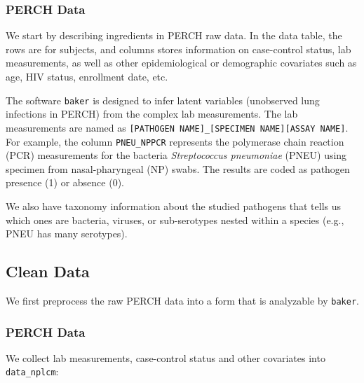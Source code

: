 \documentclass[article]{jss}
\begin{document}
\subsubsection{PERCH Data}\label{perch-data}

We start by describing ingredients in PERCH raw data. In the data table,
the rows are for subjects, and columns stores information on
case-control status, lab measurements, as well as other epidemiological
or demographic covariates such as age, HIV status, enrollment date, etc.

The software \texttt{baker} is designed to infer latent variables
(unobserved lung infections in PERCH) from the complex lab measurements.
The lab measurements are named as
\texttt{{[}PATHOGEN\ NAME{]}\_{[}SPECIMEN\ NAME{]}{[}ASSAY\ NAME{]}}.
For example, the column \texttt{PNEU\_NPPCR} represents the polymerase
chain reaction (PCR) measurements for the bacteria \emph{Streptococcus
pneumoniae} (PNEU) using specimen from nasal-pharyngeal (NP) swabs. The
results are coded as pathogen presence (1) or absence (0).

We also have taxonomy information about the studied pathogens that tells
us which ones are bacteria, viruses, or sub-serotypes nested within a
species (e.g., PNEU has many serotypes).

\subsection{Clean Data}\label{clean-data}

We first preprocess the raw PERCH data into a form that is analyzable by
\texttt{baker}.

\subsubsection{PERCH Data}\label{perch-data-1}

We collect lab measurements, case-control status and other covariates
into \texttt{data\_nplcm}:
\end{document}
